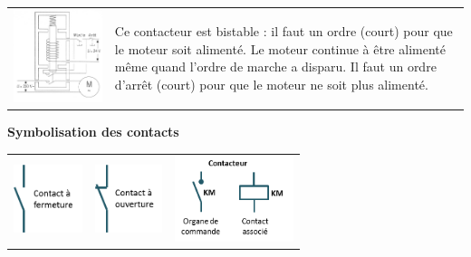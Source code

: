 \begin{tabular}{m{.45\linewidth}m{.45\linewidth}}
\includegraphics[width=.9\linewidth]{media/image99.jpeg}&
Ce contacteur est bistable : il faut un ordre (court) pour que le moteur
soit alimenté. Le moteur continue à être alimenté même quand l'ordre de
marche a disparu. Il faut un ordre d'arrêt (court) pour que le moteur ne
soit plus alimenté. 
\end{tabular}


\textbf{Symbolisation des contacts}
\begin{center}
\begin{tabular}{ccc}
\includegraphics[width=0.79201in,height=0.7874in]{media/image100.png} &
\includegraphics[width=0.76541in,height=0.7874in]{media/image101.png} &
\includegraphics[width=1.36856in,height=0.98425in]{media/image102.png} \\
\end{tabular}
\end{center}


